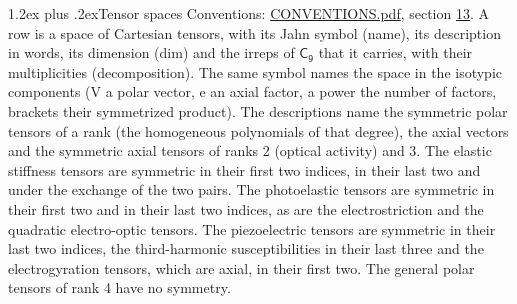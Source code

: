 \documentclass[10pt,a4paper]{article}
\makeatletter
\renewcommand\section{\@startsection{section}{1}{\z@}{-3ex plus -1ex minus -.2ex}%
  {1.2ex plus .2ex}{\normalfont\large\sffamily\bfseries\color{parttitle}}}
\numberwithin{equation}{section}
\newcommand{\grp}[1]{\mathsf{#1}}
\makeatother
\begin{document}
\section{Tensor spaces}\label{s:tensor_spaces}
Conventions: \href{../../CONVENTIONS.pdf}{CONVENTIONS.pdf}, section \href{../../CONVENTIONS.pdf\#conv.13}{13}.
\leavevmode\label{n:head.name}\label{n:head.description}\label{n:head.dim}\label{n:head.decomposition}A row is a space of Cartesian tensors, with its Jahn symbol (name), its description in words, its dimension (dim) and the irreps of $\grp{C_{9}}$ that it carries, with their multiplicities (decomposition). \label{n:label.jahn}The same symbol names the space in the isotypic components (V a polar vector, e an axial factor, a power the number of factors, brackets their symmetrized product). The descriptions name the symmetric polar tensors of a rank (the homogeneous polynomials of that degree), the axial vectors and the symmetric axial tensors of ranks 2 (optical activity) and 3. The elastic stiffness tensors are symmetric in their first two indices, in their last two and under the exchange of the two pairs. The photoelastic tensors are symmetric in their first two and in their last two indices, as are the electrostriction and the quadratic electro-optic tensors. The piezoelectric tensors are symmetric in their last two indices, the third-harmonic susceptibilities in their last three and the electrogyration tensors, which are axial, in their first two. The general polar tensors of rank 4 have no symmetry.
\end{document}
